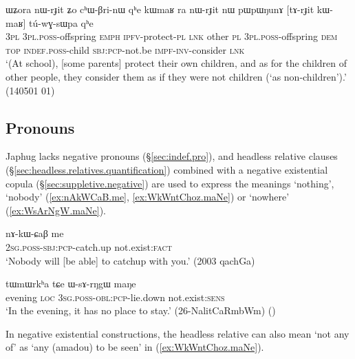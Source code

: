 \begin{exe}
	\ex \label{ex:tArJit.kWmaR}
	\gll ɯʑora nɯ-rɟit ʑo cʰɯ-βri-nɯ qʰe kɯmaʁ ra nɯ-rɟit nɯ pɯpɯŋunɤ [tɤ-rɟit kɯ-maʁ] tú-wɣ-sɯpa qʰe \\
	\textsc{3pl} \textsc{3pl}.\textsc{poss}-offspring \textsc{emph} \textsc{ipfv}-protect-\textsc{pl} \textsc{lnk} other \textsc{pl} \textsc{3pl}.\textsc{poss}-offspring \textsc{dem} \textsc{top} \textsc{indef}.\textsc{poss}-child \textsc{sbj}:\textsc{pcp}-not.be \textsc{impf}-\textsc{inv}-consider \textsc{lnk} \\
	\glt `(At school), [some parents] protect their own children, and as for the children of other people, they consider them as if they were not children (`as non-children').' (140501 01)
\end{exe}



\subsection{Pronouns} \label{sec:negative.pronoun}
Japhug lacks negative pronouns (§\ref{sec:indef.pro}), and headless relative clauses (§\ref{sec:headless.relatives.quantification}) combined with a negative existential copula (§\ref{sec:suppletive.negative})  are used to express the meanings `nothing', `nobody' (\ref{ex:nAkWCaB.me}, \ref{ex:WkWntChoz.maNe}) or `nowhere' (\ref{ex:WsArNgW.maNe}).

\begin{exe}
	\ex \label{ex:nAkWCaB.me}
	\gll nɤ-kɯ-ɕaβ me \\
	\textsc{2sg}.\textsc{poss}-\textsc{sbj}:\textsc{pcp}-catch.up not.exist:\textsc{fact} \\
	\glt `Nobody will [be able] to catchup with you.' (2003 qachGa)
\end{exe}

\begin{exe}
	\ex \label{ex:WsArNgW.maNe}
	\gll tɯmɯrkʰa tɕe ɯ-sɤ-rŋgɯ maŋe \\
	evening \textsc{loc} \textsc{3sg}.\textsc{poss}-\textsc{obl}:\textsc{pcp}-lie.down not.exist:\textsc{sens} \\
	\glt `In the evening, it has no place to stay.' (26-NalitCaRmbWm) ()
\end{exe}

In negative existential constructions, the headless relative can also mean `not any of' as  `any (amadou) to be seen' in (\ref{ex:WkWntChoz.maNe}).

